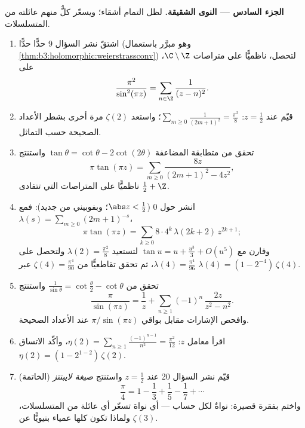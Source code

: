 \begin{problem}
\medskip
\noindent\textbf{الجزء السادس --- النوى الشقيقة.} لظل التمام
أشقاء؛ ويسعّر كلٌّ منهم عائلته من المتسلسلات.
\begin{enumerate}[resume]
  \item اشتقّ نشر السؤال 9 حدًّا حدًّا (وهو مبرَّر
        باستعمال \cref{thm:b3:holomorphic:weierstrassconv}) لتحصل، ناظميًّا على متراصات
        $\C\setminus\Z$، على
        \[
        \frac{\pi^2}{\sin^2(\pi z)} =
        \sum_{n\in\Z}\frac1{(z - n)^2} .
        \]
  \item قيّم عند $z = \frac12$: $\sum_{m\geq0}\frac1{(2m+1)^2} = \frac{\pi^2}8$؛ واستعد $\zeta(2)$ مرة
        أخرى بشطر الأعداد الصحيحة حسب التماثل.
  \item تحقق من متطابقة المضاعفة $\tan\theta =
        \cot\theta - 2\cot(2\theta)$ واستنتج
        \[
        \pi\tan(\pi z) =
        \sum_{m\geq0}\frac{8z}{(2m+1)^2 - 4z^2} ,
        \]
        ناظميًّا على المتراصات التي تتفادى $\frac12 + \Z$.
  \item انشر حول $0$ ($\abs z < \frac12$؛ وبفوبيني من جديد): فمع $\lambda(s) =
        \sum_{m\geq0}(2m+1)^{-s}$،
        \[
        \pi\tan(\pi z) =
        \sum_{k\geq0}8\cdot4^k\,\lambda(2k+2)\,z^{2k+1} ;
        \]
        وقارن مع $\tan u = u + \frac{u^3}3 + O(u^5)$ لتستعيد $\lambda(2) = \frac{\pi^2}8$ ولتحصل على $\lambda(4) = \frac{\pi^4}{96}$، ثم
        تحقق تقاطعيًّا من $\zeta(4) = \frac{\pi^4}{90}$ عبر $\lambda(4) = (1 -
        2^{-4})\,\zeta(4)$.
  \item تحقق من $\frac1{\sin\theta} = \cot\frac\theta2 -
        \cot\theta$ واستنتج
        \[
        \frac{\pi}{\sin(\pi z)} = \frac1z +
        \sum_{n\geq1}(-1)^n\,\frac{2z}{z^2 - n^2} .
        \]
        وافحص الإشارات مقابل بواقي $\pi/\sin(\pi z)$ عند الأعداد
        الصحيحة.
  \item اقرأ معامل $z$: $\eta(2) =
        \sum_{n\geq1}\frac{(-1)^{n-1}}{n^2} =
        \frac{\pi^2}{12}$، وأكّد الاتساق $\eta(2) = (1 - 2^{1-2})\,\zeta(2)$.
  \item (الخاتمة) قيّم نشر السؤال 20 عند $z =
        \frac12$ واستنتج
        \emph{صيغة لايبنتز}
        \[
        \frac\pi4 = 1 - \frac13 + \frac15 - \frac17 +
        \cdots
        \]
        واختم بفقرة قصيرة: نواةٌ لكل حساب --- أي نواة تسعّر أي
        عائلة من المتسلسلات، ولماذا تكون كلها عمياء بنيويًّا
        عن $\zeta(3)$.


\end{enumerate}
\end{problem}
